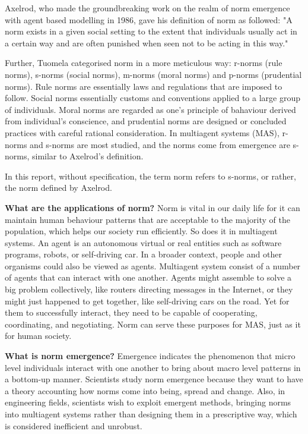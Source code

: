 \documentclass[12pt]{extarticle}
\begin{document}
Axelrod, who made the groundbreaking work on the realm of norm emergence with agent based modelling in 1986\cite{axelrod1986evolutionary}, gave his definition of norm as followed: "A norm exists in a given social setting to the extent that individuals usually act in a certain way and are often punished when seen not to be acting in this way."

Further, Tuomela categorised norm in a more meticulous way: r-norms (rule norms), s-norms (social norms), m-norms (moral norms) and p-norms (prudential norms)\cite{tuomela_1996}. Rule norms are essentially laws and regulations that are imposed to follow. Social norms essentially customs and conventions applied to a large group of individuals. Moral norms are regarded as one's principle of bahaviour derived from individual’s conscience, and prudential norms are designed or concluded practices with careful rational consideration. In multiagent systems (MAS), r-norms and s-norms are most studied, and the norms come from emergence are s-norms, similar to Axelrod's definition.

In this report, without specification, the term norm refers to s-norms, or rather, the norm defined by Axelrod.

\textbf{What are the applications of norm?} Norm is vital in our daily life for it can maintain human behaviour patterns that are acceptable to the majority of the population, which helps our society run efficiently. So does it in multiagent systems. An agent is an autonomous virtual or real entities such as software programs, robots, or self-driving car. In a broader context, people and other organisms could also be viewed as agents. Multiagent system consist of a number of agents that can interact with one another. Agents might assemble to solve a big problem collectively, like routers directing messages in the Internet, or they might just happened to get together, like self-driving cars on the road. Yet for them to successfully interact, they need to be capable of cooperating, coordinating, and negotiating. Norm can serve these purposes for MAS, just as it for human society.

\textbf{What is norm emergence?}
Emergence indicates the phenomenon that micro level individuals interact with one another to bring about macro level patterns in a bottom-up manner. Scientists study norm emergence because they want to have a theory accounting how norms come into being, spread and change. Also, in engineering fields, scientists wish to exploit emergent methods, bringing norms into multiagent systems rather than designing them in a prescriptive way, which is considered inefficient and unrobust.
\end{document}
